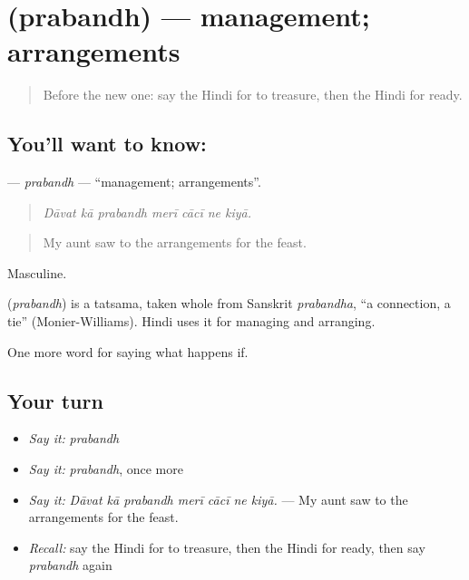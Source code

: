 \section[\texorpdfstring{\hi{प्रबंध} (prabandh)}{प्रबंध (prabandh)}]{ (prabandh) — management; arrangements}

\label{lesson:HI-C538-prabandh}



\begin{quote}
Before the new one: say the Hindi for to treasure, then the Hindi for ready.
\end{quote}

\subsection*{You'll want to know: }
\textbf{} — \emph{prabandh} — \textquotedblleft{}management; arrangements\textquotedblright{}.

\begin{quote}
      
\end{quote}

\begin{quote}
\emph{Dāvat kā prabandh merī cācī ne kiyā.}
\end{quote}

\begin{quote}
My aunt saw to the arrangements for the feast.
\end{quote}

Masculine.

\begin{cousinweb}
\textbf{} (\emph{prabandh}) is a tatsama, taken whole from Sanskrit \emph{prabandha}, \textquotedblleft{}a connection, a tie\textquotedblright{} (Monier-Williams). Hindi uses it for managing and arranging.
\end{cousinweb}

\begin{grammarlens}[title={What you've built}]
One more word for saying what happens if.
\end{grammarlens}

\subsection*{Your turn}
\begin{itemize}
\raggedright
  \item \emph{Say it:} \emph{prabandh}
  \item \emph{Say it:} \emph{prabandh}, once more
  \item \emph{Say it:} \emph{Dāvat kā prabandh merī cācī ne kiyā.} — My aunt saw to the arrangements for the feast.
  \item \emph{Recall:} say the Hindi for to treasure, then the Hindi for ready, then say \emph{prabandh} again
\end{itemize}

